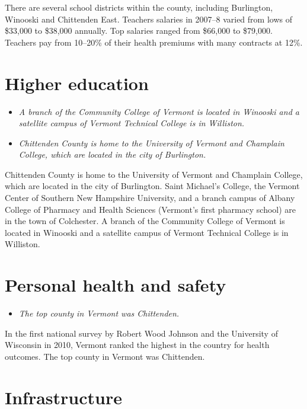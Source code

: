 There are several school districts within the county, including
Burlington, Winooski and Chittenden East. Teachers salaries in 2007--8
varied from lows of \$33,000 to \$38,000 annually. Top salaries ranged
from \$66,000 to \$79,000. Teachers pay from 10--20\% of their health
premiums with many contracts at 12\%.

\section{Higher education}\label{higher-education}

\begin{itemize}
\item
  \emph{A branch of the Community College of Vermont is located in
  Winooski and a satellite campus of Vermont Technical College is in
  Williston.}
\item
  \emph{Chittenden County is home to the University of Vermont and
  Champlain College, which are located in the city of Burlington.}
\end{itemize}

Chittenden County is home to the University of Vermont and Champlain
College, which are located in the city of Burlington. Saint Michael's
College, the Vermont Center of Southern New Hampshire University, and a
branch campus of Albany College of Pharmacy and Health Sciences
(Vermont's first pharmacy school) are in the town of Colchester. A
branch of the Community College of Vermont is located in Winooski and a
satellite campus of Vermont Technical College is in Williston.

\section{Personal health and safety}\label{personal-health-and-safety}

\begin{itemize}
\item
  \emph{The top county in Vermont was Chittenden.}
\end{itemize}

In the first national survey by Robert Wood Johnson and the University
of Wisconsin in 2010, Vermont ranked the highest in the country for
health outcomes. The top county in Vermont was Chittenden.

\section{Infrastructure}\label{infrastructure}

